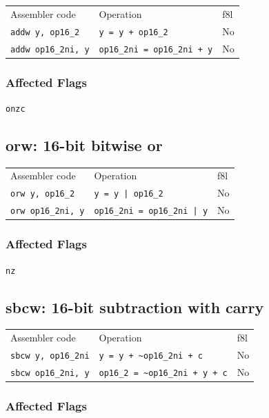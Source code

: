 \documentclass{book}
\begin{document}
\begin{tabular}{l l l}
Assembler code               & Operation                          & f8l \\
\texttt{addw y, op16\_2}     & \texttt{y = y + op16\_2}           & No \\
\texttt{addw op16\_2ni, y}   & \texttt{op16\_2ni = op16\_2ni + y} & No
\end{tabular}

\subsubsection*{Affected Flags}

\texttt{onzc}


\subsection{orw: 16-bit bitwise or}

\begin{tabular}{l l l}
Assembler code             & Operation                          & f8l \\
\texttt{orw y, op16\_2}    & \texttt{y = y | op16\_2}           & No \\
\texttt{orw op16\_2ni, y}  & \texttt{op16\_2ni = op16\_2ni | y} & No
\end{tabular}

\subsubsection*{Affected Flags}

\texttt{nz}


\subsection{sbcw: 16-bit subtraction with carry}

\begin{tabular}{l l l}
Assembler code              & Operation                                & f8l \\
\texttt{sbcw y, op16\_2ni}  & \texttt{y = y + \~{}op16\_2ni + c}       & No \\
\texttt{sbcw op16\_2ni, y}  & \texttt{op16\_2 = \~{}op16\_2ni + y + c} & No
\end{tabular}

\subsubsection*{Affected Flags}
\end{document}
